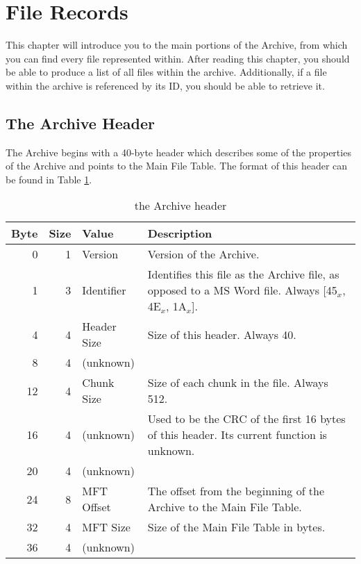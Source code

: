 \section{File Records}
\label{sec:filerecords}

This chapter will introduce you to the main portions of the Archive, from which 
you can find every file represented within.  After reading this chapter, you
should be able to produce a list of all files within the archive.  Additionally,
if a file within the archive is referenced by its ID, you should be able to
retrieve it.

\subsection{The Archive Header}
\label{subsec:archhead}

The Archive begins with a 40-byte header which describes some of the properties
of the Archive and points to the Main File Table.  The format of this header
can be found in Table \ref{tab:archhead}.

\begin{table}[htp]
	\caption{the Archive header}
	\label{tab:archhead}
	
	\begin{tabular}{|r|r|l|p{3in}|}
		\hline
		\textbf{Byte} & \textbf{Size} & \textbf{Value} & \textbf{Description} \\
		\hline
		 0 & 1 & Version    & Version of the Archive.  \\
		\hline
		 1 & 3 & Identifier & Identifies this file as the Archive file, as
		                      opposed to a MS Word file.  Always
							  [45$_x$, 4E$_x$, 1A$_x$].  \\
		\hline
		 4 & 4 & Header Size & Size of this header.  Always 40.  \\
		\hline
		 8 & 4 & (unknown)   &  \\
		\hline
		12 & 4 & Chunk Size  & Size of each chunk in the file.  Always 512.  \\
		\hline
		16 & 4 & (unknown)   & Used to be the CRC of the first 16 bytes of this
		                       header.  Its current function is unknown.  \\
		\hline
		20 & 4 & (unknown)   &  \\
		\hline
		24 & 8 & MFT Offset  & The offset from the beginning of the Archive to
		                       the Main File Table.  \\
		\hline
		32 & 4 & MFT Size    & Size of the Main File Table in bytes.  \\
		\hline
		36 & 4 & (unknown)   &  \\
		\hline
	\end{tabular}
\end{table}

